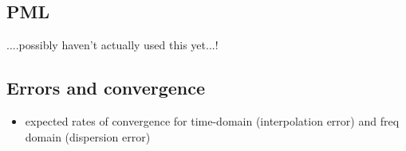 \subsection{PML}
....possibly haven't actually used this yet...!

\subsection{Errors and convergence}
\begin{itemize}
  \item expected rates of convergence for time-domain (interpolation error) and freq domain (dispersion error)
\end{itemize}

